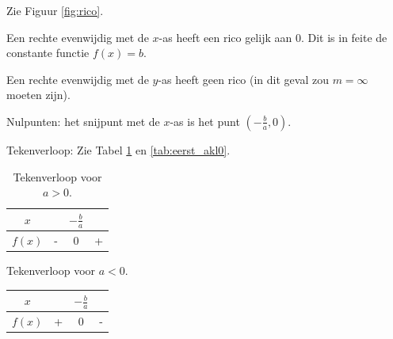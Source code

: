 Zie Figuur \ref{fig:rico}.

Een rechte evenwijdig met de $x$-as heeft een rico gelijk
aan 0. Dit is in feite de constante functie $f(x)=b$.

Een rechte evenwijdig met de $y$-as heeft geen rico (in
dit geval zou $m=\infty$ moeten zijn). 

Nulpunten: het snijpunt met de $x$-as is het
punt $(-\frac{b}{a},0)$.

%

Tekenverloop: Zie Tabel \ref{tab:eerst_agr0} en \ref{tab:eerst_akl0}.
\begin{table}[h]
	\centering\begin{tabular}{c||c|c|c}
		$x$ &  & $-\frac{b}{a}$ & \\
		\hline 
		$f(x)$ & - & 0 & +\\
	\end{tabular}
\caption{Tekenverloop voor $a>0$.}
\label{tab:eerst_agr0}
\end{table}

\begin{tabel}{Tekenverloop voor $a<0$.}
	\centering\begin{tabular}{c||c|c|c}
		$x$ &  & $-\frac{b}{a}$ & \\
		\hline 
		$f(x)$ & + & 0 & -\\
	\end{tabular}
	\label{tab:eerst_akl0}
\end{tabel}

